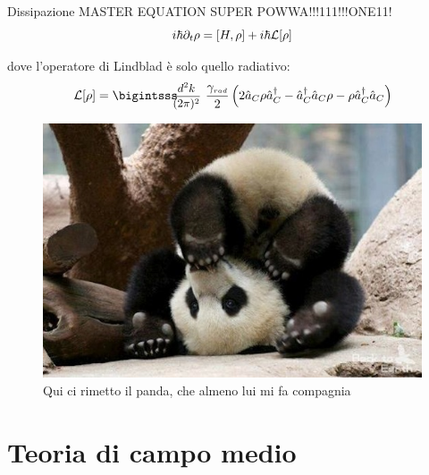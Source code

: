 \documentclass[10pt]{beamer}
\begin{document}
\begin{frame}{Dissipazione}
MASTER EQUATION \alert{SUPER POWWA}!!!111!!!ONE11!
\begin{equation*}
i\hbar \partial_t\rho = [H,\rho] + i\hbar \mathcal{L}[\rho]
\end{equation*}

dove l'operatore di Lindblad è solo quello radiativo:
\begin{equation*}
\lind \rho = \intk \frac{\gamma_{{\scriptscriptstyle rad}}}{2} \left ( 2\oa_C\rho \oa_C^\dagger - \oa_C^\dagger \oa_C \rho - \rho \oa_C^\dagger \oa_C \right )
\end{equation*}

\begin{figure}
       \includegraphics[scale=.3]{files/Panda.jpg}
       \caption{\footnotesize Qui ci rimetto il panda, che almeno lui mi fa compagnia}
      \end{figure}
 
\end{frame}


\section{Teoria di campo medio}
\end{document}
